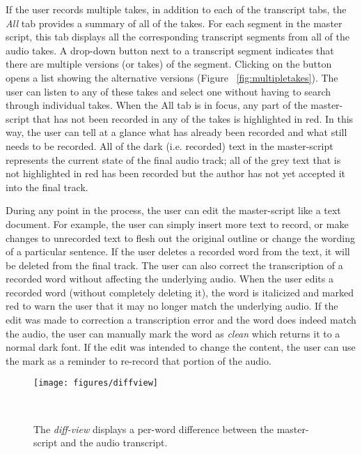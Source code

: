 
If the user records multiple takes, in addition to each of the transcript tabs, the \textit{All} tab provides a summary of all of the takes. For each segment in the master script, this tab displays all the corresponding transcript segments from all of the audio takes. A drop-down button next to a transcript segment  indicates that there are multiple versions (or takes)  of the  segment. Clicking on the button opens a list showing the alternative versions (Figure ~\ref{fig:multipletakes}). The user can listen to any of these takes and select one without having to search through individual takes. When the All tab is in focus, any part of the master-script that has not been recorded in any of the takes is highlighted in red. In this way, the user can tell at a glance what has already been recorded and what still needs to be recorded. All of the dark (i.e. recorded) text in the master-script represents the current state of the final audio track; all of the grey text that is not highlighted in red has been recorded but the author has not yet accepted it into the final track. 

During any point in the process, the user can edit the master-script like a text document.  For example, the user can simply insert more text to record, or make changes to unrecorded text to flesh out the original outline or change the wording of a particular sentence. If the user deletes a recorded word from the text, it will be deleted from the final track. The user can also correct the transcription of a recorded word without affecting the underlying audio. When the user edits a recorded word (without completely deleting it), the word is italicized and marked red to warn the user that it may no longer match the underlying audio. If the edit was made to correction a transcription error and the word does indeed match the audio, the user can manually mark the word as \textit{clean} which returns it to a normal dark font. If the edit was intended to change the content, the user can use the mark as a reminder to re-record that portion of the audio.
\begin{figure}
\centering
  \texttt{[image: figures/diffview]}
  \caption{The \textit{diff-view} displays a per-word difference between the master-script and the audio transcript. }~\label{fig:diffview}
\end{figure}


